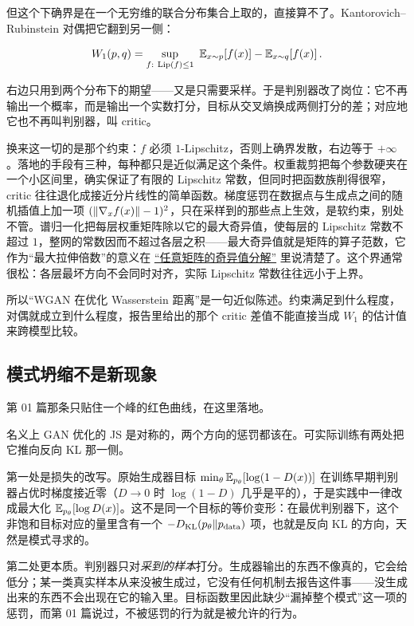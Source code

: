 但这个下确界是在一个无穷维的联合分布集合上取的，直接算不了。Kantorovich--Rubinstein 对偶把它翻到另一侧：

\[
W_1(p,q)=\sup_{f:\ \operatorname{Lip}(f)\le1}\ \E_{x\sim p}\!\left[f(x)\right]-\E_{x\sim q}\!\left[f(x)\right].
\]

右边只用到两个分布下的期望——又是只需要采样。于是判别器改了岗位：它不再输出一个概率，而是输出一个实数打分，目标从交叉熵换成两侧打分的差；对应地它也不再叫判别器，叫 critic。

换来这一切的是那个约束：\(f\) 必须 \(1\)-Lipschitz，否则上确界发散，右边等于 \(+\infty\)。落地的手段有三种，每种都只是近似满足这个条件。权重裁剪把每个参数硬夹在一个小区间里，确实保证了有限的 Lipschitz 常数，但同时把函数族削得很窄，critic 往往退化成接近分片线性的简单函数。梯度惩罚在数据点与生成点之间的随机插值上加一项 \((\left\lVert\nabla_x f(x)\right\rVert-1)^2\)，只在采样到的那些点上生效，是软约束，别处不管。谱归一化把每层权重矩阵除以它的最大奇异值，使每层的 Lipschitz 常数不超过 \(1\)，整网的常数因而不超过各层之积——最大奇异值就是矩阵的算子范数，它作为``最大拉伸倍数''的意义在 \hyperref[sec:03-Linear-Algebra/07-SVD-and-Data-Applications/01]{``任意矩阵的奇异值分解''} 里说清楚了。这个界通常很松：各层最坏方向不会同时对齐，实际 Lipschitz 常数往往远小于上界。

所以``WGAN 在优化 Wasserstein 距离''是一句近似陈述。约束满足到什么程度，对偶就成立到什么程度，报告里给出的那个 critic 差值不能直接当成 \(W_1\) 的估计值来跨模型比较。

\subsection{模式坍缩不是新现象}

第 01 篇那条只贴住一个峰的红色曲线，在这里落地。

名义上 GAN 优化的 JS 是对称的，两个方向的惩罚都该在。可实际训练有两处把它推向反向 KL 那一侧。

第一处是损失的改写。原始生成器目标 \(\min_\theta\mathbb{E}_{p_\theta}[\log(1-D(x))]\) 在训练早期判别器占优时梯度接近零（\(D\to0\) 时 \(\log(1-D)\) 几乎是平的），于是实践中一律改成最大化 \(\mathbb{E}_{p_\theta}[\log D(x)]\)。这不是同一个目标的等价变形：在最优判别器下，这个非饱和目标对应的量里含有一个 \(-D_{\mathrm{KL}}(p_\theta\Vert p_{\text{data}})\) 项，也就是反向 KL 的方向，天然是模式寻求的。

第二处更本质。判别器只对\emph{采到的样本}打分。生成器输出的东西不像真的，它会给低分；某一类真实样本从来没被生成过，它没有任何机制去报告这件事——没生成出来的东西不会出现在它的输入里。目标函数里因此缺少``漏掉整个模式''这一项的惩罚，而第 01 篇说过，不被惩罚的行为就是被允许的行为。

